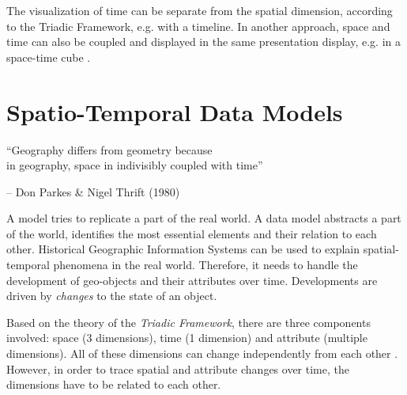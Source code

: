 The visualization of time can be separate from the spatial dimension, according to the Triadic Framework, e.g. with a timeline. In another approach, space and time can also be coupled and displayed in the same presentation display, e.g. in a space-time cube \cite{haegerstrand1970}.






\section{Spatio-Temporal Data Models} %
\label{sec:spatio_temporal_data_models}
\begin{quoteit}
  ``Geography differs from geometry because \\
  in geography, space in indivisibly coupled with time''
\end{quoteit}
\hfill -- Don Parkes \& Nigel Thrift (1980)

A model tries to replicate a part of the real world. A data model abstracts a part of the world, identifies the most essential elements and their relation to each other. Historical Geographic Information Systems can be used to explain spatial-temporal phenomena in the real world. Therefore, it needs to handle the development of geo-objects and their attributes over time. Developments are driven by \emph{changes} to the state of an object.

Based on the theory of the \emph{Triadic Framework}, there are three components involved: space (3 dimensions), time (1 dimension) and attribute (multiple dimensions). All of these dimensions can change independently from each other
\cite[p. 53]{ott2001time}.
However, in order to trace spatial and attribute changes over time, the dimensions have to be related to each other.


